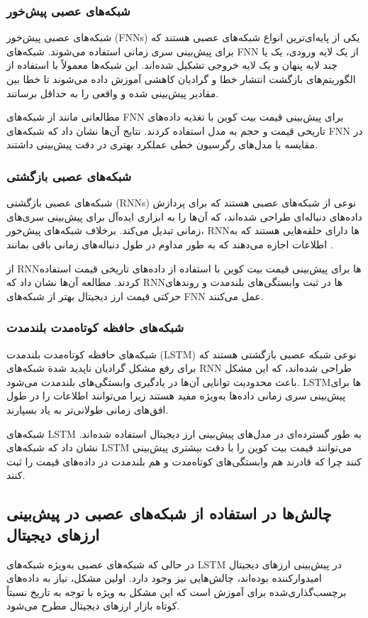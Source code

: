 {\subsubsection{شبکه‌های عصبی پیش‌خور}
شبکه‌های عصبی پیش‌خور (FNNs) یکی از پایه‌ای‌ترین انواع شبکه‌های عصبی هستند که برای پیش‌بینی سری زمانی استفاده می‌شوند. شبکه‌های FNN از یک لایه ورودی، یک یا چند لایه پنهان و یک لایه خروجی تشکیل شده‌اند. این شبکه‌ها معمولاً با استفاده از الگوریتم‌های بازگشت انتشار خطا و گرادیان کاهشی آموزش داده می‌شوند تا خطا بین مقادیر پیش‌بینی شده و واقعی را به حداقل برسانند.


مطالعاتی مانند \cite{author3} از شبکه‌های FNN برای پیش‌بینی قیمت بیت کوین با تغذیه داده‌های تاریخی قیمت و حجم به مدل استفاده کردند. نتایج آن‌ها نشان داد که شبکه‌های FNN در مقایسه با مدل‌های رگرسیون خطی عملکرد بهتری در دقت پیش‌بینی داشتند.


\subsubsection{شبکه‌های عصبی بازگشتی}
شبکه‌های عصبی بازگشتی (RNNs) نوعی از شبکه‌های عصبی هستند که برای پردازش داده‌های دنباله‌ای طراحی شده‌اند، که آن‌ها را به ابزاری ایده‌آل برای پیش‌بینی سری‌های زمانی تبدیل می‌کند. برخلاف شبکه‌های پیش‌خور، RNNها دارای حلقه‌هایی هستند که به اطلاعات اجازه می‌دهند که به طور مداوم در طول دنباله‌های زمانی باقی بمانند
.

\cite{author4} از RNNها برای پیش‌بینی قیمت بیت کوین با استفاده از داده‌های تاریخی قیمت استفاده کردند. مطالعه آن‌ها نشان داد که RNNها در ثبت وابستگی‌های بلندمدت و روندهای حرکتی قیمت ارز دیجیتال بهتر از شبکه‌های FNN عمل می‌کنند.

\subsubsection{شبکه‌های حافظه کوتاه‌مدت بلندمدت}
شبکه‌های حافظه کوتاه‌مدت بلندمدت (LSTM) نوعی شبکه عصبی بازگشتی هستند که برای رفع مشکل گرادیان ناپدید شدة شبکه‌های RNN طراحی شده‌اند، که این مشکل باعث محدودیت توانایی آن‌ها در یادگیری وابستگی‌های بلندمدت می‌شود. LSTMها برای پیش‌بینی سری زمانی داده‌ها به‌ویژه مفید هستند زیرا می‌توانند اطلاعات را در طول افق‌های زمانی طولانی‌تر به یاد بسپارند.


شبکه‌های LSTM به طور گسترده‌ای در مدل‌های پیش‌بینی ارز دیجیتال استفاده شده‌اند. \cite{author5} نشان داد که شبکه‌های LSTM می‌توانند قیمت بیت کوین را با دقت بیشتری پیش‌بینی کنند چرا که قادرند هم وابستگی‌های کوتاه‌مدت و هم بلندمدت در داده‌های قیمت را ثبت کنند.


\subsection{چالش‌ها در استفاده از شبکه‌های عصبی در پیش‌بینی ارزهای دیجیتال}
در حالی که شبکه‌های عصبی به‌ویژه شبکه‌های LSTM در پیش‌بینی ارزهای دیجیتال امیدوارکننده بوده‌اند، چالش‌هایی نیز وجود دارد. اولین مشکل، نیاز به داده‌های برچسب‌گذاری‌شده برای آموزش است که این مشکل به ویژه با توجه به تاریخ نسبتاً کوتاه بازار ارزهای دیجیتال مطرح می‌شود.


}

